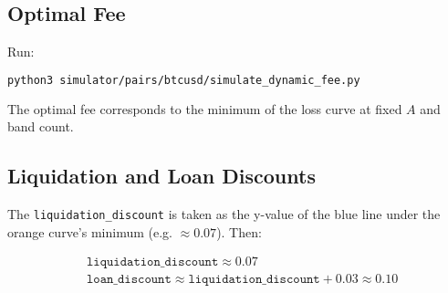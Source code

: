 \documentclass[notitlepage]{revtex4-2}
\begin{document}
\subsection{Optimal Fee}
Run:
\begin{lstlisting}[language=bash]
python3 simulator/pairs/btcusd/simulate_dynamic_fee.py
\end{lstlisting}
The optimal fee corresponds to the minimum of the loss curve at fixed $A$ and band count.

\subsection{Liquidation and Loan Discounts}
The \texttt{liquidation\_discount} is taken as the y-value of the blue line under the orange curve’s minimum
(e.g. $\approx0.07$). Then:
\begin{flushleft}
\[
\begin{aligned}
& \texttt{liquidation\_discount} \approx 0.07\\
%
& \texttt{loan\_discount} \approx \texttt{liquidation\_discount} + 0.03 \approx 0.10
\end{aligned}
\]
\end{flushleft}
\end{document}
